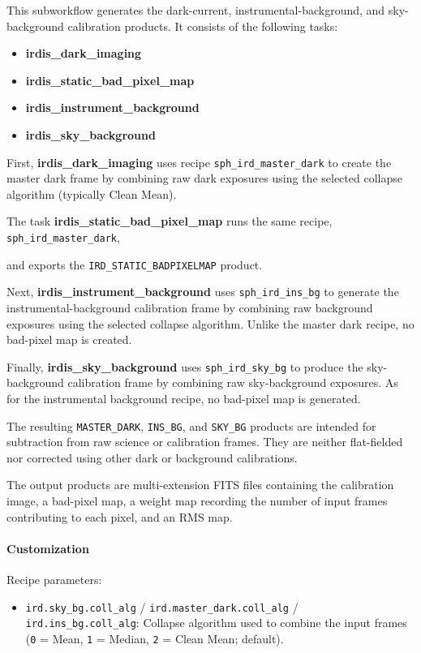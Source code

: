This subworkflow generates the dark-current, instrumental-background, and
sky-background calibration products. It consists of the following tasks:

\begin{itemize}
    \item \textbf{irdis\_dark\_imaging}
    \item \textbf{irdis\_static\_bad\_pixel\_map}
    \item \textbf{irdis\_instrument\_background}
    \item \textbf{irdis\_sky\_background}
\end{itemize}

First, \textbf{irdis\_dark\_imaging} uses recipe \texttt{sph\_ird\_master\_dark} to create the master dark frame by
combining raw dark exposures using the selected collapse algorithm (typically
Clean Mean). 

The task \textbf{irdis\_static\_bad\_pixel\_map} runs the same recipe,
\texttt{sph\_ird\_master\_dark}, 

and exports the
\texttt{IRD\_STATIC\_BADPIXELMAP} product.

Next, \textbf{irdis\_instrument\_background} uses \texttt{sph\_ird\_ins\_bg} to generate the instrumental-background
calibration frame by combining raw background exposures using the selected
collapse algorithm. Unlike the master dark recipe, no bad-pixel map is created.

Finally, \textbf{irdis\_sky\_background} uses \texttt{sph\_ird\_sky\_bg} to produce the sky-background calibration frame
by combining raw sky-background exposures. As for the instrumental background
recipe, no bad-pixel map is generated.

The resulting \texttt{MASTER\_DARK}, \texttt{INS\_BG}, and
\texttt{SKY\_BG} products are intended for subtraction from raw science or calibration frames. They are neither flat-fielded nor corrected
using other dark or background calibrations.

The output products are multi-extension FITS files containing the calibration image, a bad-pixel map, a weight map recording the number of input frames contributing to each pixel, and an RMS map.

\paragraph{Customization}

Recipe parameters:

\begin{itemize}
\item \texttt{ird.sky\_bg.coll\_alg} / \texttt{ird.master\_dark.coll\_alg} / \texttt{ird.ins\_bg.coll\_alg}: Collapse algorithm used to combine the input frames
(\texttt{0} = Mean,
 \texttt{1} = Median,
 \texttt{2} = Clean Mean; default).
\end{itemize}

